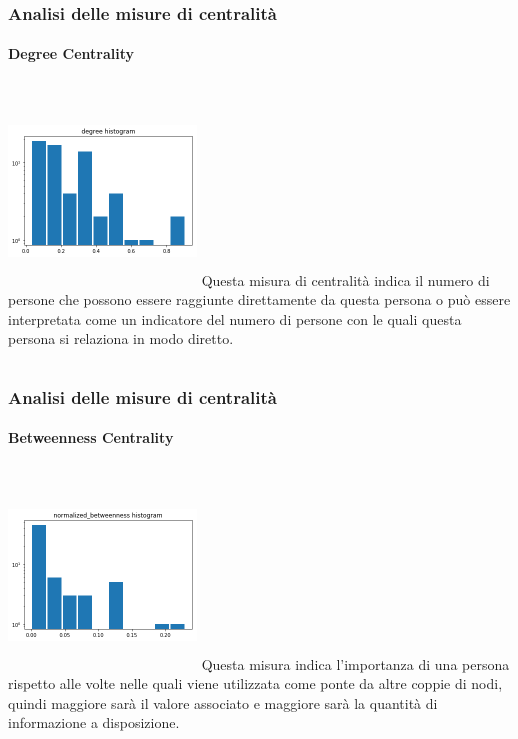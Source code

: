 \documentclass{beamer}
\begin{document}
\begin{frame}
\frametitle{Analisi delle misure di centralità}
\framesubtitle{Degree Centrality}
\begin{columns}
             \centering
             \includegraphics[height=5cm, width=5cm]{misure_grafo/degree_all.png}
              Questa misura di centralità indica il numero di persone che possono essere raggiunte direttamente da questa persona o può essere interpretata come un indicatore del numero di persone con le quali questa persona si relaziona in modo diretto. 
         \end{columns} 

\end{frame}


\begin{frame}
\frametitle{Analisi delle misure di centralità}
\framesubtitle{Betweenness Centrality}
\begin{columns}
             \centering
             \includegraphics[height=5cm, width=5cm]{misure_grafo/betwe_all.png}
              Questa misura indica l'importanza di una persona rispetto alle volte nelle quali viene utilizzata come ponte da altre coppie di nodi, quindi maggiore sarà il valore associato e maggiore sarà la quantità di informazione a disposizione. 
         \end{columns} 

\end{frame}
\end{document}
